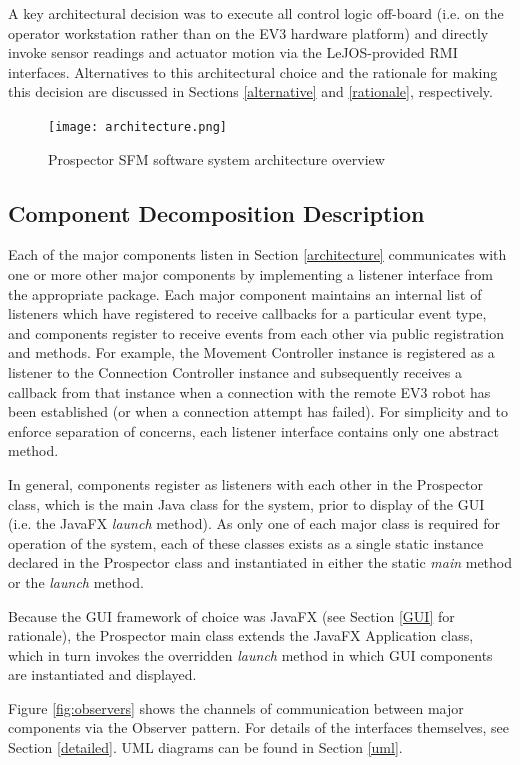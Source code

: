 \documentclass[12pt]{article}
\begin{document}
A key architectural decision was to execute all control logic off-board (i.e. on the operator workstation rather than on the EV3 hardware platform) and directly invoke sensor readings and actuator motion via the LeJOS-provided RMI interfaces. Alternatives to this architectural choice and the rationale for making this decision are discussed in Sections \ref{alternative} and \ref{rationale}, respectively.

\begin{figure}[!htb]
\centering\texttt{[image: architecture.png]}
\caption{Prospector SFM software system architecture overview}
  \label{fig:architecture}
\end{figure}

\subsection{Component Decomposition Description}
Each of the major components listen in Section \ref{architecture} communicates with one or more other major components by implementing a listener interface from the appropriate package. Each major component maintains an internal list of listeners which have registered to receive callbacks for a particular event type, and components register to receive events from each other via public registration and methods. For example, the Movement Controller instance is registered as a listener to the Connection Controller instance and subsequently receives a callback from that instance when a connection with the remote EV3 robot has been established (or when a connection attempt has failed). For simplicity and to enforce separation of concerns, each listener interface contains only one abstract method.

In general, components register as listeners with each other in the Prospector class, which is the main Java class for the system, prior to display of the GUI (i.e. the JavaFX \textit{launch} method). As only one of each major class is required for operation of the system, each of these classes exists as a single static instance declared in the Prospector class and instantiated in either the static \textit{main} method or the \textit{launch} method.

Because the GUI framework of choice was JavaFX (see Section \ref{GUI} for rationale), the Prospector main class extends the JavaFX Application class, which in turn invokes the overridden \textit{launch} method in which GUI components are instantiated and displayed. 

Figure \ref{fig:observers} shows the channels of communication between major components via the Observer pattern. For details of the interfaces themselves, see Section \ref{detailed}. UML diagrams can be found in Section \ref{uml}.
\end{document}

